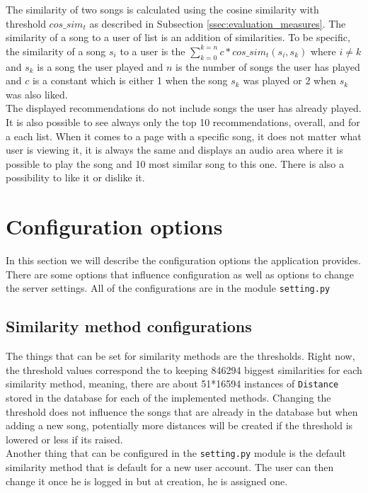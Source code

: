 The similarity of two songs is calculated using the cosine similarity with threshold $cos\_sim_t$ as described in Subsection \ref{ssec:evaluation_measures}. The similarity of a song to a user of list is an addition of similarities. To be specific, the similarity of a song $s_i$ to a user is the $ \sum_{k=0}^{k=n} c*cos\_sim_t(s_i, s_k) $  where $ i \neq k $ and $ s_k $ is a song the user played and $n$ is the number of songs the user has played and $c$ is a constant which is either 1 when the song $s_k$ was played or 2 when $s_k$ was also liked. \\
The displayed recommendations do not include songs the user has already played. It is also possible to see always only the top 10 recommendations, overall, and for a each list. When it comes to a page with a specific song, it does not matter what user is viewing it, it is always the same and displays an audio area where it is possible to play the song and 10 most similar song to this one. There is also a possibility to like it or dislike it.\\ 

\section{Configuration options}

In this section we will describe the configuration options the application provides. There are some options that influence configuration as well as options to change the server settings. All of the configurations are in the module \texttt{setting.py}

\subsection{Similarity method configurations}
The things that can be set for similarity methods are the thresholds. Right now, the threshold values correspond the to keeping 846294 biggest similarities for each similarity method, meaning, there are about 51*16594 instances of \texttt{Distance} stored in the database for each of the implemented methods. Changing the threshold does not influence the songs that are already in the database but when adding a new song, potentially more distances will be created if the threshold is lowered or less if its raised. \\
Another thing that can be configured in the \texttt{setting.py} module is the default similarity method that is default for a new user account. The user can then change it once he is logged in but at creation, he is assigned one.


